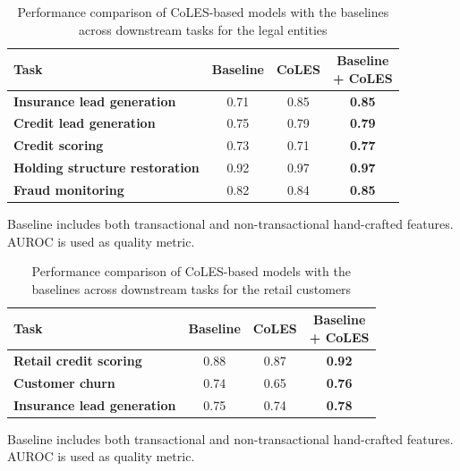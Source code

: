 \documentclass[sigconf, anonymous]{acmart}
\begin{document}
\begin{table}
\centering
\caption{Performance comparison of CoLES-based models with the baselines across downstream tasks for the legal entities}
\begin{tabularx}{\linewidth}{Xccc}
\toprule
\textbf{Task} & \textbf{Baseline } & \textbf{CoLES} & \makecell{\textbf{Baseline} \\ \textbf{+ CoLES}} \\ 
\midrule
\textbf{Insurance lead generation} & 0.71 & 0.85 & \textbf{0.85} \\
\textbf{Credit lead generation} & 0.75 & 0.79 & \textbf{0.79} \\
\textbf{Credit scoring} & 0.73 & 0.71 & \textbf{0.77} \\
\textbf{Holding structure restoration} & 0.92 & 0.97 & \textbf{0.97} \\
\textbf{Fraud monitoring} & 0.82 & 0.84 & \textbf{0.85} \\
\bottomrule
\end{tabularx}
\small{Baseline includes both transactional and non-transactional hand-crafted features. AUROC is used as quality metric.}
\label{tab-internal-company}
\end{table}



\begin{table}
\centering
\caption{Performance comparison of CoLES-based models with the baselines across downstream tasks for the retail customers}
\begin{tabularx}{\linewidth}{Xccc}
\toprule
\textbf{Task } & \textbf{Baseline} & \textbf{CoLES} & \makecell{\textbf{Baseline}\\\textbf{+ CoLES}} \\
\midrule
\textbf{Retail credit scoring} & 0.88 & 0.87 & \textbf{0.92} \\
\textbf{Customer churn} & 0.74 & 0.65 & \textbf{0.76} \\
\textbf{Insurance lead generation} & 0.75 & 0.74 & \textbf{0.78} \\ %
\bottomrule
\end{tabularx}

\small{Baseline includes both transactional and non-transactional hand-crafted features. AUROC is used as quality metric.}
\label{tab-internal-person}
\end{table}
\end{document}
